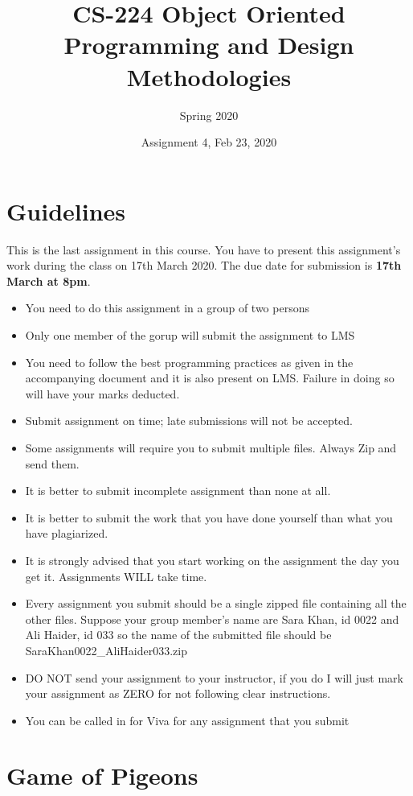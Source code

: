 \documentclass[a4paper,12pt]{article}
\begin{document}
	
	\title{CS-224 Object Oriented Programming and Design Methodologies }
	\author{Spring 2020}
	\date{Assignment 4, Feb 23, 2020}
	\maketitle
	\section{Guidelines}
	This is the last assignment in this course. You have to present this assignment's work during the class on 17th March 2020. The due date for submission is \textbf{17th March at 8pm}.
	
	\begin{itemize}
		\item You need to do this assignment in a group of two persons
		\item Only one member of the gorup will submit the assignment to LMS
		\item You need to follow the best programming practices as given in the accompanying document and it is also present on LMS. Failure in doing so will have your marks deducted.
		\item Submit assignment on time; late submissions will not be accepted.
		\item Some assignments will require you to submit multiple files. Always Zip and send them.
		\item It is better to submit incomplete assignment than none at all.
		\item It is better to submit the work that you have done yourself than what you have plagiarized.
		\item It is strongly advised that you start working on the assignment the day you get it. Assignments WILL take time.
		\item Every assignment you submit should be a single zipped file containing all the other files. Suppose your group member's name are Sara Khan, id 0022 and Ali Haider, id 033 so the name of the submitted file should be SaraKhan0022\_AliHaider033.zip
		\item DO NOT send your assignment to your instructor, if you do I will just mark your assignment as ZERO for not following clear instructions.
		\item You can be called in for Viva for any assignment that you submit
	\end{itemize}
	
	\newpage
	
	\section{Game of Pigeons}
\end{document}
